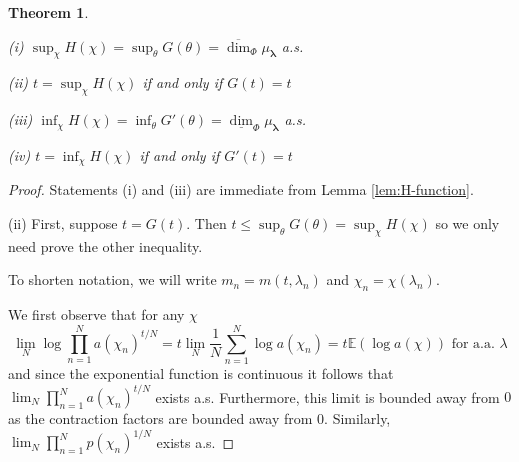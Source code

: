\documentclass{amsart}
\newtheorem{theorem}{Theorem}
\theoremstyle{plain}
\numberwithin{equation}{section}
\newcommand{\blambda}{{\boldsymbol{\lambda}}}
\newcommand{\ee}{{\mathbb E}}
\newcommand{\odim}{\overline{\dim}}
\newcommand{\udim}{\underline{\dim}}
\begin{document}
\begin{theorem} \label{thm:G(t)=t}

(i) $\sup_{\chi }H(\chi )=\sup_{\theta }G(\theta )=\odim_\Phi\mu_\blambda $ a.s.

(ii) $t= \sup_{\chi }H(\chi )$ if and only if $G(t)=t$

(iii) $\inf_\chi H(\chi) = \inf_\theta G'(\theta) = \udim_\Phi \mu_\blambda$ a.s.

(iv) $t = \inf_\chi H(\chi)$ if and only if $G'(t) = t$
 
\end{theorem}

\begin{proof}
Statements (i) and (iii) are immediate from Lemma \ref{lem:H-function}.

(ii) First, suppose $t=G(t)$. 
Then $t\leq \sup_{\theta }G(\theta)=\sup_{\chi }H(\chi )$ so we only need prove the other inequality.

To shorten notation, we will write $m_{n}=m(t,\lambda _{n})$ and $\chi _{n}=\chi(\lambda _{n})$.

We first observe that for any $\chi$  
\begin{equation*}
      \lim_{N}\log \prod_{n=1}^{N}a(\chi _{n})^{t/N}=
    t\lim_{N}\frac{1}{N}\sum_{n=1}^{N}\log a(\chi _{n})=
   t\ee(\log a(\chi ))\text{ for a.a. } \lambda 
\end{equation*}
and since the exponential function is continuous it follows that $\lim_{N}\prod_{n=1}^{N}a(\chi _{n})^{t/N}$ exists a.s.  
Furthermore, this limit is bounded away from $0$ as the contraction factors are bounded away from $0$. 
Similarly, $\lim_{N}\prod_{n=1}^{N}p(\chi _{n})^{1/N}$ exists a.s.


\end{proof}
\end{document}
